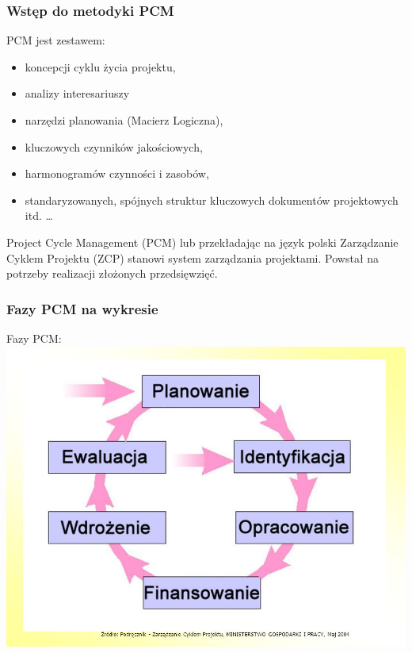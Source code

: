 \documentclass{beamer}
\begin{document}
\begin{frame}\frametitle{Wstęp do metodyki PCM}
	\begin{exampleblock}{PCM jest zestawem:}
        \begin{itemize}  
            \item koncepcji cyklu życia projektu,
            \item analizy interesariuszy
            \item narzędzi planowania (Macierz Logiczna),
            \item kluczowych czynników jakościowych,
            \item harmonogramów czynności i zasobów,
            \item standaryzowanych, spójnych struktur kluczowych dokumentów projektowych itd. \ldots 
        \end{itemize}
	    
	\end{exampleblock}
	Project Cycle Management (PCM) lub przekładając na język polski Zarządzanie Cyklem Projektu (ZCP) stanowi system zarządzania projektami. Powstał na potrzeby realizacji złożonych przedsięwzięć. 
\end{frame}

\begin{frame}\frametitle{Fazy PCM na wykresie}
	\begin{block}{Fazy PCM:}
		\includegraphics[scale=0.3]{images/fazy_latex.jpg}
		\centering
	\end{block}
\end{frame}
\end{document}

